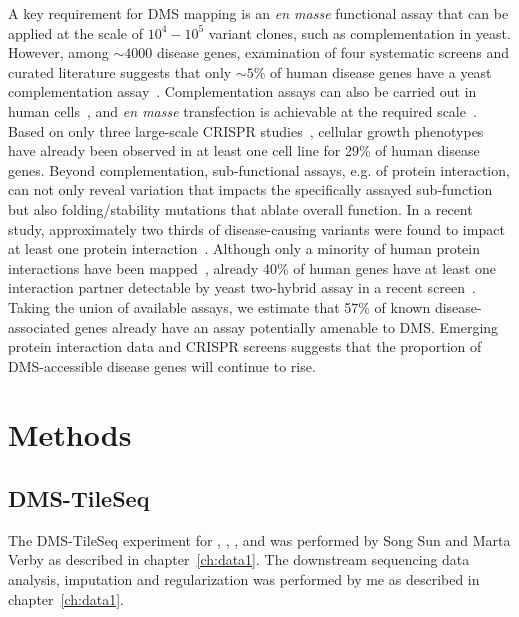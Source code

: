 A key requirement for DMS mapping is an \textit{en masse} functional assay that can be applied at the scale of $10^4-10^5$ variant clones, such as complementation in yeast.  However, among $\sim 4000$ disease genes, examination of four systematic screens and curated literature suggests that only $\sim 5\%$ of human disease genes have a yeast complementation assay~\cite{hamza_complementation_2015,kachroo_systematic_2015,sun_extended_2016}. Complementation assays can also be carried out in human cells~\cite{wagenaar_resistance_2014}, and \textit{en masse} transfection is achievable at the required scale~\cite{blomen_gene_2015}. Based on only three large-scale CRISPR studies~\cite{hart_high-resolution_2015,blomen_gene_2015,wang_genetic_2014}, cellular growth phenotypes have already been observed in at least one cell line for 29\% of human disease genes.  Beyond complementation, sub-functional assays, e.g. of protein interaction, can not only reveal variation that impacts the specifically assayed sub-function but also folding/stability mutations that ablate overall function. In a recent study, approximately two thirds of disease-causing variants were found to impact at least one protein interaction~\cite{sahni_widespread_2015}. Although only a minority of human protein interactions have been mapped~\cite{rolland_proteome-scale_2014}, already 40\% of human genes have at least one interaction partner detectable by yeast two-hybrid assay in a recent screen~\cite{rolland_proteome-scale_2014}. Taking the union of available assays, we estimate that 57\% of known disease-associated genes already have an assay potentially amenable to DMS. Emerging protein interaction data and CRISPR screens suggests that the proportion of DMS-accessible disease genes will continue to rise. 

\section{Methods}

\subsection{DMS-TileSeq}
The DMS-TileSeq experiment for , , , and  was performed by Song Sun and Marta Verby as described in chapter~\ref{ch:data1}. The downstream sequencing data analysis, imputation and regularization was performed by me as described in chapter~\ref{ch:data1}.

